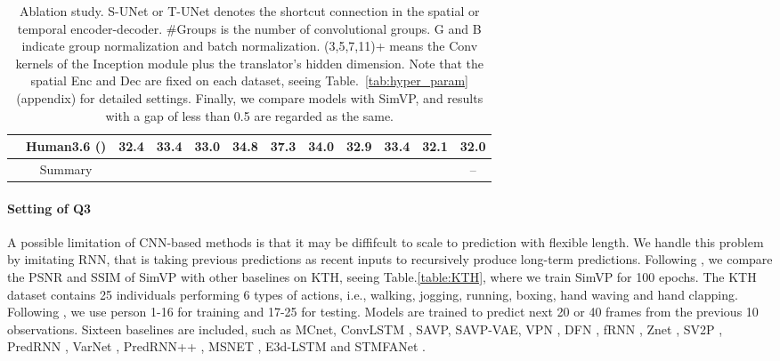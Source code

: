 \documentclass[10pt,twocolumn,letterpaper]{article}
\begin{document}
\begin{table*}[t]
{\begin{tabular}{c|ccccc|ccccc|c}
                                      & Human3.6 ()         & 32.4  & 33.4  & 33.0  & 34.8 & 37.3 & 34.0  & 32.9  &  33.4  &  32.1  & 32.0\\ \hline
      & Summary &   &   &  &  &  &  &  &  &  & --\\\hline
  \end{tabular}}
  \caption{Ablation study. S-UNet or T-UNet denotes the shortcut connection in the spatial or temporal encoder-decoder. \#Groups is the number of convolutional groups. G and B indicate group normalization and batch normalization. (3,5,7,11)+ means the Conv kernels of the Inception module plus the translator's hidden dimension. Note that the spatial Enc and Dec are fixed on each dataset, seeing Table.~\ref{tab:hyper_param} (appendix) for detailed settings. Finally, we compare models with SimVP, and results with a gap of less than 0.5 are regarded as the same.}
  \label{tab:ablation}
  \vspace{-3mm}
\end{table*}

\vspace{-2mm}
\paragraph{Setting of Q3} A possible limitation of CNN-based methods is that it may be diffifcult to scale to prediction with flexible length. We handle this problem by imitating RNN, that is taking previous predictions as recent inputs to recursively produce long-term predictions. Following \cite{wang2018eidetic,oprea2020review}, we compare the PSNR and SSIM of SimVP with other baselines on KTH, seeing Table.\ref{table:KTH}, where we train SimVP for 100 epochs. The KTH dataset \cite{schuldt2004recognizing} contains 25 individuals performing 6 types of actions, i.e., walking, jogging, running, boxing, hand waving and hand clapping. Following \cite{villegas2017decomposing,wang2018eidetic}, we use person 1-16 for training and 17-25 for testing. Models are trained to predict next 20 or 40 frames from the previous 10 observations. Sixteen baselines are included, such as MCnet\cite{villegas2017decomposing}, ConvLSTM \cite{xingjian2015convolutional}, SAVP, SAVP-VAE\cite{lee2018stochastic}, VPN \cite{kalchbrenner2017video}, DFN \cite{jia2016dynamic}, fRNN \cite{oliu2018folded}, Znet \cite{zhang2019z}, SV2P \cite{babaeizadeh2017stochastic}, PredRNN \cite{wang2017predrnn}, VarNet \cite{jin2018varnet}, PredRNN++ \cite{wang2018predrnn++}, MSNET \cite{lee2018mutual}, E3d-LSTM \cite{wang2018eidetic} and STMFANet \cite{jin2020exploring}. 
\end{document}
